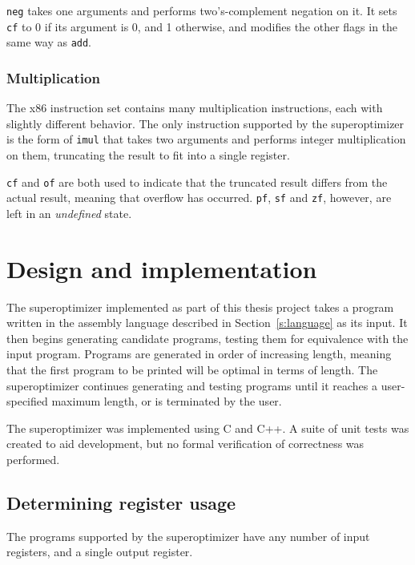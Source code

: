 \documentclass[a4paper,11pt]{kth-mag}
\begin{document}
\verb|neg| takes one arguments and performs two's-complement negation on it.
It sets \verb|cf| to 0 if its argument is 0, and 1 otherwise, and modifies the other flags in the same way as \verb|add|.

\subsection{Multiplication}

The x86 instruction set contains many multiplication instructions, each with slightly different behavior.
The only instruction supported by the superoptimizer is the form of \verb|imul| that takes two arguments and performs integer multiplication on them, truncating the result to fit into a single register.

\verb|cf| and \verb|of| are both used to indicate that the truncated result differs from the actual result, meaning that overflow has occurred.
\verb|pf|, \verb|sf| and \verb|zf|, however, are left in an \emph{undefined} state.

\chapter{Design and implementation}
\label{ch:design_implementation}

The superoptimizer implemented as part of this thesis project takes a program written in the assembly language described in Section~\ref{s:language} as its input.
It then begins generating candidate programs, testing them for equivalence with the input program.
Programs are generated in order of increasing length, meaning that the first program to be printed will be optimal in terms of length.
The superoptimizer continues generating and testing programs until it reaches a user-specified maximum length, or is terminated by the user.


The superoptimizer was implemented using C and C++.
A suite of unit tests was created to aid development, but no formal verification of correctness was performed.

\section{Determining register usage}


The programs supported by the superoptimizer have any number of input registers, and a single output register.
\end{document}
